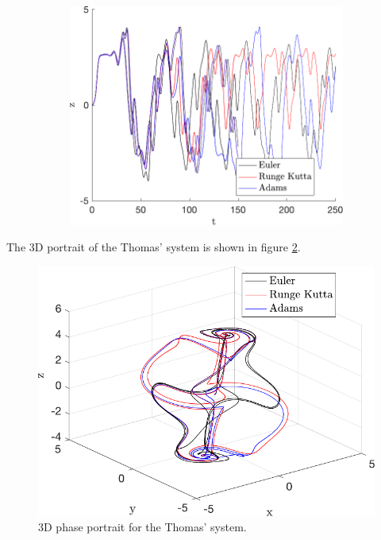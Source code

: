 \begin{figure}[H]
\begin{subfigure}[ht]{0.3\textwidth}
\end{subfigure}
\begin{subfigure}[ht]{0.3\textwidth}
\includegraphics[scale=0.33]{files/ThomasZvsT.pdf}
\end{subfigure}
\caption{}
\label{fig:thomasExample}
\end{figure}

The 3D portrait of the Thomas' system is shown in figure \ref{fig:thomas3d}.
\begin{figure}[H]
    \centering
    \includegraphics[scale=0.6]{files/3DThomas.pdf}
    \caption{3D phase portrait for the Thomas' system.}
    \label{fig:thomas3d}
\end{figure}

